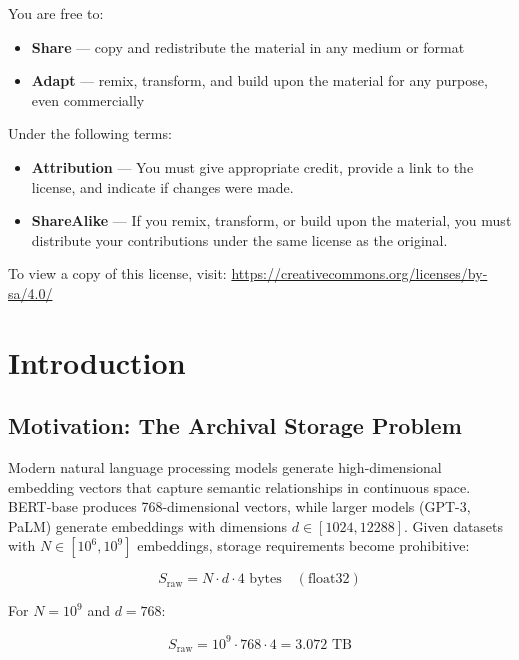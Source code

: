 \documentclass[11pt,a4paper]{article}
\begin{document}
You are free to:
\begin{itemize}
    \item \textbf{Share} --- copy and redistribute the material in any medium or format
    \item \textbf{Adapt} --- remix, transform, and build upon the material for any purpose, even commercially
\end{itemize}

Under the following terms:
\begin{itemize}
    \item \textbf{Attribution} --- You must give appropriate credit, provide a link to the license, and indicate if changes were made.
    \item \textbf{ShareAlike} --- If you remix, transform, or build upon the material, you must distribute your contributions under the same license as the original.
\end{itemize}

\noindent To view a copy of this license, visit: \url{https://creativecommons.org/licenses/by-sa/4.0/}

\noindent\hrulefill

\vspace{1em}

\section{Introduction}

\subsection{Motivation: The Archival Storage Problem}

Modern natural language processing models generate high-dimensional embedding vectors that capture semantic relationships in continuous space. BERT-base \cite{devlin2019bert} produces 768-dimensional vectors, while larger models (GPT-3, PaLM) generate embeddings with dimensions $d \in [1024, 12288]$. Given datasets with $N \in [10^6, 10^9]$ embeddings, storage requirements become prohibitive:

\begin{equation}
S_{\text{raw}} = N \cdot d \cdot 4 \text{ bytes} \quad (\text{float32})
\end{equation}

For $N = 10^9$ and $d = 768$:

\begin{equation}
S_{\text{raw}} = 10^9 \cdot 768 \cdot 4 = 3.072 \text{ TB}
\end{equation}
\end{document}

